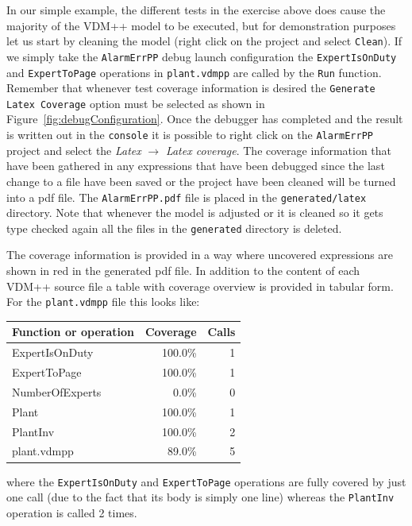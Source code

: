 In our simple example, the different tests in the exercise above does
cause the majority of the VDM++ model to be executed, but for
demonstration purposes let us start by cleaning the model (right click
on the project and select \texttt{Clean}). If we simply take the
\texttt{AlarmErrPP} debug launch configuration the
\verb|ExpertIsOnDuty| and \verb|ExpertToPage| operations in 
\verb|plant.vdmpp| are called by the
\texttt{Run} function. Remember that whenever test coverage
information is desired the \texttt{Generate Latex Coverage} option
must be selected as shown in Figure~\ref{fig:debugConfiguration}. 
Once the debugger has completed and the result
is written out in the \texttt{console} it is possible to right click
on the \texttt{AlarmErrPP} project and select the \emph{Latex} $
\rightarrow $ \emph{Latex coverage}. The coverage information that have
been gathered in any expressions that have been debugged since the
last change to a file have been saved or the project have been cleaned
will be turned into a pdf file. The \texttt{AlarmErrPP.pdf} file is
placed in the \texttt{generated/latex} directory. Note that whenever the model is adjusted or it
is cleaned so it gets type checked again all the files in the
\texttt{generated} directory is deleted.

The coverage information is provided in a way where uncovered
expressions are shown in red in the generated pdf file. In addition
to the content of each VDM++ source file a table with coverage
overview is provided in tabular form. For the \texttt{plant.vdmpp}
file this looks like:

\begin{longtable}{|l|r|r|}
\hline
Function or operation & Coverage & Calls \\
\hline
\hline
ExpertIsOnDuty & 100.0\% & 1 \\
\hline
ExpertToPage & 100.0\% & 1 \\
\hline
NumberOfExperts & 0.0\% & 0 \\
\hline
Plant & 100.0\% & 1 \\
\hline
PlantInv & 100.0\% & 2 \\
\hline
\hline
plant.vdmpp & 89.0\% & 5 \\
\hline
\end{longtable}

\noindent where the \texttt{ExpertIsOnDuty} and \texttt{ExpertToPage} 
operations are fully covered
by just one call (due to the fact that its body is simply one line)
whereas the \texttt{PlantInv} operation is called 2 times.



